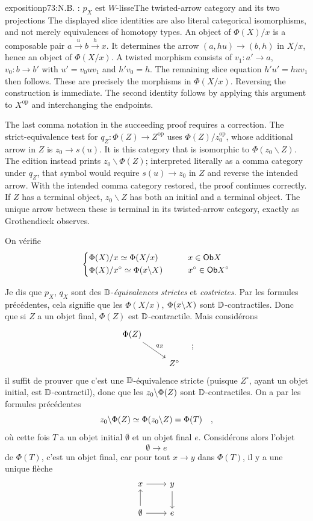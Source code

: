 \begin{dcomment}{exposition}{p73:N.B. : $p_X$ est $W$-lisse}{The twisted-arrow category and its two projections}
The displayed slice identities are also literal categorical isomorphisms, and not merely equivalences of homotopy types. An object of $\Phi(X)/x$ is a composable pair $a\xrightarrow{u}b\xrightarrow{h}x$. It determines the arrow $(a,hu)\to(b,h)$ in $X/x$, hence an object of $\Phi(X/x)$. A twisted morphism consists of $v_1:a'\to a$, $v_0:b\to b'$ with $u'=v_0uv_1$ and $h'v_0=h$. The remaining slice equation $h'u'=huv_1$ then follows. These are precisely the morphisms in $\Phi(X/x)$. Reversing the construction is immediate. The second identity follows by applying this argument to $X^{\mathrm{op}}$ and interchanging the endpoints.

The last comma notation in the succeeding proof requires a correction. The strict-equivalence test for $q_Z:\Phi(Z)\to Z^{\mathrm{op}}$ uses $\Phi(Z)/z_0^{\mathrm{op}}$, whose additional arrow in $Z$ is $z_0\to s(u)$. It is this category that is isomorphic to $\Phi(z_0\backslash Z)$. The edition instead prints $z_0\backslash\Phi(Z)$; interpreted literally as a comma category under $q_Z$, that symbol would require $s(u)\to z_0$ in $Z$ and reverse the intended arrow. With the intended comma category restored, the proof continues correctly. If $Z$ has a terminal object, $z_0\backslash Z$ has both an initial and a terminal object. The unique arrow between these is terminal in its twisted-arrow category, exactly as Grothendieck observes.
\end{dcomment}



On vérifie
\[
\left\{
\begin{aligned}
&\Phi(X)/x \simeq \Phi(X/x) &\qquad& x \in \mathsf{Ob} X\\
&\Phi(X)/x^\circ \simeq \Phi(x\backslash X) &\qquad& x^\circ \in \mathsf{Ob} X^\circ
\end{aligned}
\right.
\]

Je dis que $p_X$, $q_X$ sont des $\mathbb{D}$-\textit{équivalences strictes} et \textit{costrictes.} Par les formules précédentes, cela signifie que les $\Phi(X/x)$, $\Phi(x\backslash X)$ sont $\mathbb{D}$-contractiles. Donc que si $Z$ a un objet final, $\Phi(Z)$ est $\mathbb{D}$-contractile. Mais considérons
\[
\begin{tikzcd}
\Phi(Z) \arrow[dr, "q_Z"] & \\
& Z^\circ
\end{tikzcd}
\quad ;
\]
il suffit de prouver que c'est une $\mathbb{D}$-équivalence stricte (puisque $Z^\circ$, ayant un objet initial, est $\mathbb{D}$-contractil), donc que les $z_0\backslash\Phi(Z)$ sont $\mathbb{D}$-contractiles. On a par les formules précédentes %
\[
z_0\backslash\Phi(Z) \simeq \Phi(z_0\backslash Z) = \Phi(T) \quad ,
\]
où cette fois $T$ a un objet initial $\emptyset$ et un objet final $e$. Considérons alors l'objet
\[
\emptyset \longrightarrow e
\]
de $\Phi(T)$, c'est un objet final, car pour tout $x \to y$ dans $\Phi(T)$, il y a une unique flèche
\[
\begin{tikzcd}
x \arrow[r] & y \arrow[d] \\
\emptyset \arrow[u] \arrow[r] & e
\end{tikzcd}
\]

